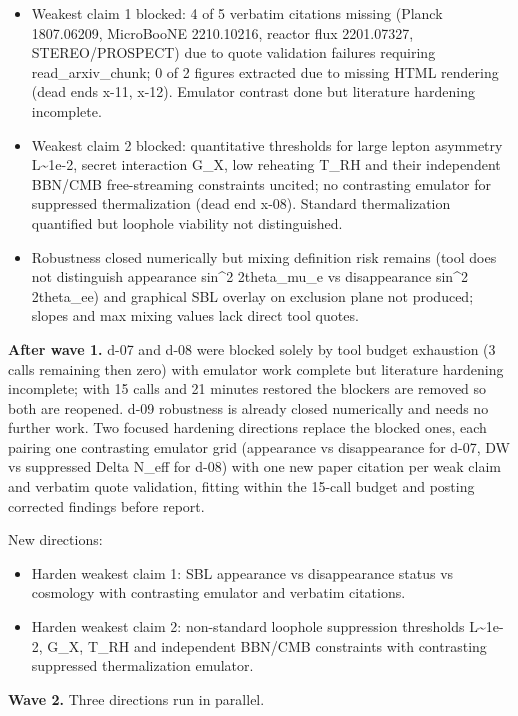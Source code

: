 \documentclass[11pt,a4paper]{article}
\begin{document}
\begin{itemize}
  \item Weakest claim 1 blocked: 4 of 5 verbatim citations missing (Planck 1807.06209, MicroBooNE 2210.10216, reactor flux 2201.07327, STEREO/PROSPECT) due to quote validation failures requiring read\_arxiv\_chunk; 0 of 2 figures extracted due to missing HTML rendering (dead ends x-11, x-12). Emulator contrast done but literature hardening incomplete.
  \item Weakest claim 2 blocked: quantitative thresholds for large lepton asymmetry L\textasciitilde{}1e-2, secret interaction G\_X, low reheating T\_RH and their independent BBN/CMB free-streaming constraints uncited; no contrasting emulator for suppressed thermalization (dead end x-08). Standard thermalization quantified but loophole viability not distinguished.
  \item Robustness closed numerically but mixing definition risk remains (tool does not distinguish appearance sin\textasciicircum{}2 2theta\_mu\_e vs disappearance sin\textasciicircum{}2 2theta\_ee) and graphical SBL overlay on exclusion plane not produced; slopes and max mixing values lack direct tool quotes.
\end{itemize}
\textbf{After wave 1.} d-07 and d-08 were blocked solely by tool budget exhaustion (3 calls remaining then zero) with emulator work complete but literature hardening incomplete; with 15 calls and 21 minutes restored the blockers are removed so both are reopened. d-09 robustness is already closed numerically and needs no further work. Two focused hardening directions replace the blocked ones, each pairing one contrasting emulator grid (appearance vs disappearance for d-07, DW vs suppressed Delta N\_eff for d-08) with one new paper citation per weak claim and verbatim quote validation, fitting within the 15-call budget and posting corrected findings before report.

New directions:

\begin{itemize}
  \item Harden weakest claim 1: SBL appearance vs disappearance status vs cosmology with contrasting emulator and verbatim citations.
  \item Harden weakest claim 2: non-standard loophole suppression thresholds L\textasciitilde{}1e-2, G\_X, T\_RH and independent BBN/CMB constraints with contrasting suppressed thermalization emulator.
\end{itemize}
\textbf{Wave 2.} Three directions run in parallel.
\end{document}
